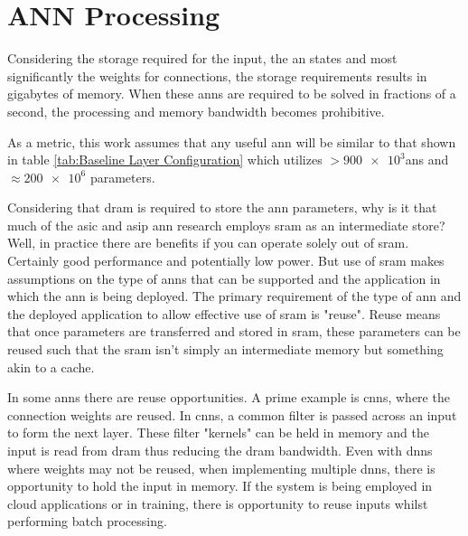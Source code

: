 \section[ANN Processing]{ANN Processing}
\label{sec:ANN Processing}

Considering the storage required for the input, the \ac{an} states and most significantly the weights for connections, the storage requirements results in gigabytes of memory.
When these \ac{ann}s are required to be solved in fractions of a second, the processing and memory bandwidth becomes prohibitive.

As a metric, this work assumes that any useful \ac{ann} will be similar to that shown in table \ref{tab:Baseline Layer Configuration} which utilizes $>\num{900e3}$\acp{an} and $\approx\num{200e6}$ parameters. 
\iffalse
Given the bandwidth and storage requirements shown in table \ref{tab:Bandwidth and Storage Design Requirements}, the problem becomes \hyphenquote{american}{\textbf{\textcolor{black}{to provide deterministic at or near real-time performance within tolerable power and space constraints for edge systems employing inference on multiple disparate useful-sized neural networks.}}}
\fi
\iffalse
Considering that \ac{dram} is required to store the \ac{ann} parameters, why is it that much of the \ac{asic} and \ac{asip} \ac{ann} research employs \ac{sram} as an intermediate store? Well, in practice there are benefits if you can operate solely out of \ac{sram}.
Certainly good performance and potentially low power.
But use of \ac{sram} makes assumptions on the type of \acp{ann} that can be supported and the application in which the \ac{ann} is being deployed.
The primary requirement of the type of \ac{ann} and the deployed application to allow effective use of \ac{sram} is "reuse". Reuse means that once parameters are transferred and stored in \ac{sram}, these parameters can be reused such that the \ac{sram} isn't simply an intermediate memory but something akin to a cache.

In some \ac{ann}s there are reuse opportunities. A prime example is \acp{cnn}, where the connection weights are reused. In \acp{cnn}, a common filter is passed across an input to form the next layer. These filter "kernels" can be held in memory and the input is read from \ac{dram} thus reducing the \ac{dram} bandwidth.
Even with \ac{dnn}s where weights may not be reused, when implementing multiple \ac{dnn}s, there is opportunity to hold the input in memory.
If the system is being employed in cloud applications or in training, there is opportunity to reuse inputs whilst performing batch processing.

